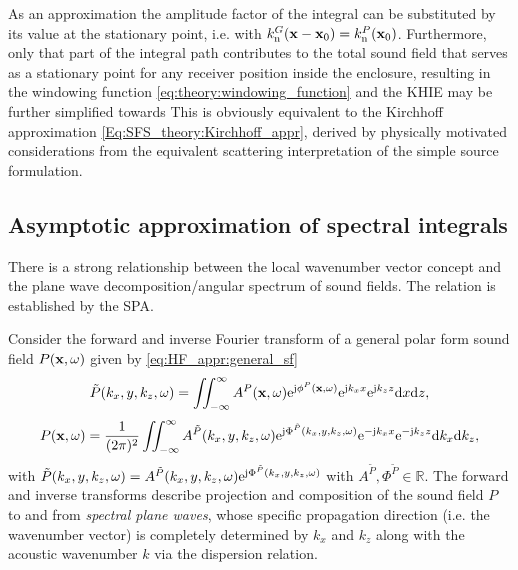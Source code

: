As an approximation the amplitude factor of the integral can be substituted by its value at the stationary point, i.e. with $k_{\mathrm{n}}^G(\mathbf{x}-\mathbf{x}_0) = k_{\mathrm{n}}^P(\mathbf{x}_0)$.
Furthermore, only that part of the integral path contributes to the total sound field that serves as a stationary point for any receiver position inside the enclosure,
resulting in the windowing function \eqref{eq:theory:windowing_function} and the KHIE may be further simplified towards
This is obviously equivalent to the Kirchhoff approximation \eqref{Eq:SFS_theory:Kirchhoff_appr}, derived by physically motivated considerations from the equivalent scattering interpretation of the simple source formulation.

\subsection{Asymptotic approximation of spectral integrals}
\label{Sec:SPA_for_Fourier}
There is a strong relationship between the local wavenumber vector concept and the plane wave decomposition/angular spectrum of sound fields.
The relation is established by the SPA.

Consider the forward and inverse Fourier transform of a general polar form sound field $P(\mathbf{x},\omega)$ given by \eqref{eq:HF_appr:general_sf}
\begin{equation}
\tilde{P}(k_x,y,k_z,\omega) = \iint_{-\infty}^{\infty} A^P(\mathbf{x},\omega)\mathrm{e}^{\mathrm{j} \phi^P(\mathbf{x},\omega)} \mathrm{e}^{\mathrm{j} k_x x} \mathrm{e}^{\mathrm{j} k_z z} \mathrm{d} x \mathrm{d} z,
\label{eq:forward_transform}
\end{equation}
\begin{equation}
P(\mathbf{x},\omega) = \frac{1}{(2\pi)^2} \iint_{-\infty}^{\infty} A^{\tilde{P}}(k_x,y,k_z,\omega)\mathrm{e}^{\mathrm{j} \Phi^{\tilde{P}}(k_x,y,k_z,\omega)}  \mathrm{e}^{-\mathrm{j} k_x x} \mathrm{e}^{-\mathrm{j} k_z z} \mathrm{d} k_x \mathrm{d} k_z,
\label{eq:inverse_transform}
\end{equation}
with $\tilde{P}(k_x,y,k_z,\omega) = A^{\tilde{P}}(k_x,y,k_z,\omega)\mathrm{e}^{\mathrm{j} \Phi^{\tilde{P}}(k_x,y,k_z,\omega)}$ with $A^{\tilde{P}}, \Phi^{\tilde{P}}\in\mathbb{R}$.
The forward and inverse transforms describe projection and composition of the sound field $P$ to and from \emph{spectral plane waves}, whose specific propagation direction (i.e. the wavenumber vector) is completely determined by $k_x$ and $k_z$ along with the acoustic wavenumber $k$ via the dispersion relation.

